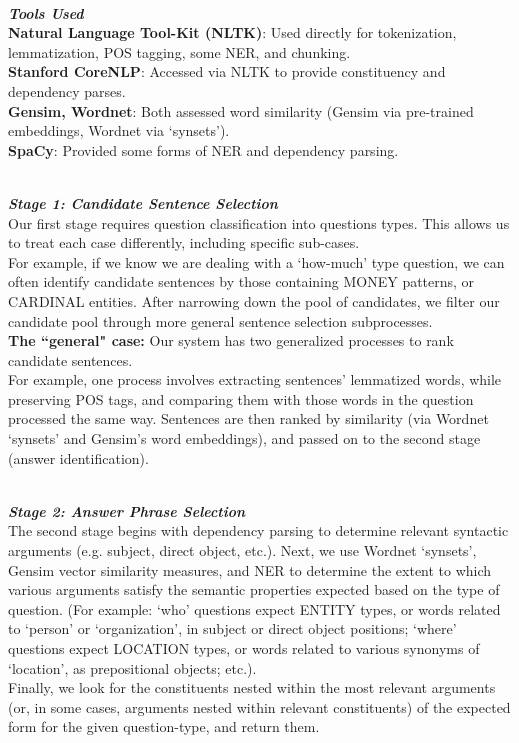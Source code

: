 \documentclass[a1,landscape]{a0poster}
\begin{document}
\begin{multicols}{3}
\color{DarkSlateGray} %

\textit{\textbf{\LARGE \\Tools Used}}\\
\textbf{Natural Language Tool-Kit (NLTK)}: Used directly for tokenization, lemmatization, POS tagging, some NER, and chunking.\\
\textbf{Stanford CoreNLP}: Accessed via NLTK to provide constituency and dependency parses. \\
\textbf{Gensim, Wordnet}: Both assessed word similarity (Gensim via pre-trained embeddings, Wordnet via `synsets'). \\
\textbf{SpaCy}: Provided some forms of NER and dependency parsing.

\textit{\textbf{\LARGE \\Stage 1: Candidate Sentence Selection}}\\
Our first stage requires question classification into questions types. This allows us to treat each case differently, including specific sub-cases. \\
For example, if we know we are dealing with a `how-much' type question, we can often identify candidate sentences by those containing MONEY patterns, or CARDINAL entities. After narrowing down the pool of candidates, we filter our candidate pool through more general sentence selection subprocesses. \\
\textbf{The ``general" case:} Our system has two generalized processes to rank candidate sentences.\\ For example, one process involves extracting sentences' lemmatized words, while preserving POS tags, and comparing them with those words in the question processed the same way. Sentences are then ranked by similarity (via Wordnet `synsets' and Gensim's word embeddings), and passed on to the second stage (answer identification).

\textit{\textbf{\LARGE \\Stage 2: Answer Phrase Selection}}\\
The second stage begins with dependency parsing to determine relevant syntactic arguments (e.g. subject, direct object, etc.). Next, we use Wordnet `synsets', Gensim vector similarity measures, and NER to determine the extent to which various arguments satisfy the semantic properties expected based on the type of question. (For example: `who' questions expect ENTITY types, or words related to `person' or `organization', in subject or direct object positions; `where' questions expect LOCATION types, or words related to various synonyms of `location', as prepositional objects; etc.). \\
Finally, we look for the constituents nested within the most relevant arguments (or, in some cases, arguments nested within relevant constituents) of the expected form for the given question-type, and return them.


\end{multicols}
\end{document}
